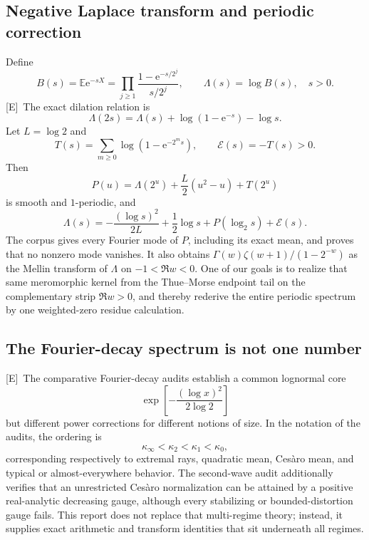 \documentclass[11pt,oneside]{article}
\theoremstyle{definition}
\theoremstyle{remark}
\newcommand{\E}{\mathbb E}
\newcommand{\e}{\mathrm e}
\newcommand{\statusE}{\textsf{[E]}}
\begin{document}
\subsection{Negative Laplace transform and periodic correction}
Define
\begin{equation}
 B(s)=\E\e^{-sX}
 =\prod_{j\ge1}\frac{1-\e^{-s/2^j}}{s/2^j},
 \qquad \Lambda(s)=\log B(s),\quad s>0.                   \label{eq:B}
\end{equation}
\statusE\ The exact dilation relation is
\begin{equation}
 \Lambda(2s)=\Lambda(s)+\log(1-\e^{-s})-\log s.           \label{eq:Lambda-dilation}
\end{equation}
Let $L=\log2$ and
\begin{equation}
 T(s)=\sum_{m\ge0}\log(1-\e^{-2^ms}),\qquad
 \mathcal E(s)=-T(s)>0.                                   \label{eq:E-tail}
\end{equation}
Then
\begin{equation}
 P(u)=\Lambda(2^u)+\frac L2(u^2-u)+T(2^u)                 \label{eq:P-def}
\end{equation}
is smooth and $1$-periodic, and
\begin{equation}
 \boxed{\Lambda(s)=-\frac{(\log s)^2}{2L}+\frac12\log s
 +P(\log_2s)+\mathcal E(s).}                              \label{eq:Lambda-periodic}
\end{equation}
The corpus gives every Fourier mode of $P$, including its exact mean, and proves that no
nonzero mode vanishes.  It also obtains
$\Gamma(w)\zeta(w+1)/(1-2^{-w})$ as the Mellin transform of $\Lambda$ on
$-1<\Re w<0$.  One of our goals is to realize that same meromorphic kernel from the
Thue--Morse endpoint tail on the complementary strip $\Re w>0$, and thereby rederive the
entire periodic spectrum by one weighted-zero residue calculation.

\subsection{The Fourier-decay spectrum is not one number}
\statusE\ The comparative Fourier-decay audits establish a common lognormal core
\[
 \exp\!\left[-\frac{(\log x)^2}{2\log2}\right]
\]
but different power corrections for different notions of size.  In the notation of the
audits, the ordering is
\[
 \kappa_\infty<\kappa_2<\kappa_1<\kappa_0,
\]
corresponding respectively to extremal rays, quadratic mean, Ces\`aro mean, and typical or
almost-everywhere behavior.  The second-wave audit additionally verifies that an
unrestricted Ces\`aro normalization can be attained by a positive real-analytic decreasing
gauge, although every stabilizing or bounded-distortion gauge fails.  This report does not
replace that multi-regime theory; instead, it supplies exact arithmetic and transform
identities that sit underneath all regimes.
\end{document}

